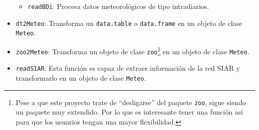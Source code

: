 \begin{itemize}
\begin{itemize}
\item \texttt{readBDi}: Procesa datos meteorológicos de tipo intradiarios.
\end{itemize}
\item \texttt{dt2Meteo}: Transforma un \texttt{data.table} o \texttt{data.frame} en un objeto de clase \texttt{Meteo}.
\item \texttt{zoo2Meteo}: Transforma un objeto de clase \texttt{zoo}\footnote{Pese a que este proyecto trate de ``desligarse'' del paquete \texttt{zoo}, sigue siendo un paquete muy extendido. Por lo que es interesante tener una función así para que los usuarios tengan una mayor flexibilidad.} en un objeto de clase \texttt{Meteo}.
\item \texttt{readSIAR}: Esta función es capaz de extraer información de la red SIAR y transformarlo en un objeto de clase \texttt{Meteo}.
\end{itemize}

